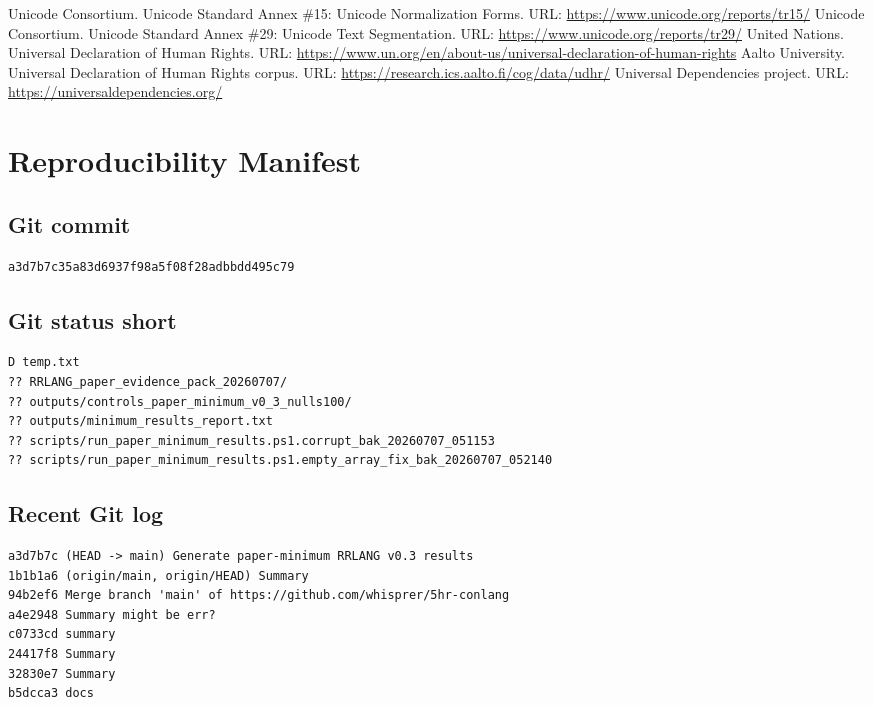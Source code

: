\documentclass[11pt,a4paper]{article}
\begin{document}
\begin{thebibliography}{99}
 Unicode Consortium. Unicode Standard Annex \#15: Unicode Normalization Forms. URL: \url{https://www.unicode.org/reports/tr15/}
 Unicode Consortium. Unicode Standard Annex \#29: Unicode Text Segmentation. URL: \url{https://www.unicode.org/reports/tr29/}
 United Nations. Universal Declaration of Human Rights. URL: \url{https://www.un.org/en/about-us/universal-declaration-of-human-rights}
 Aalto University. Universal Declaration of Human Rights corpus. URL: \url{https://research.ics.aalto.fi/cog/data/udhr/}
 Universal Dependencies project. URL: \url{https://universaldependencies.org/}
\end{thebibliography}


\appendix
\section{Reproducibility Manifest}
\subsection{Git commit}
\begin{lstlisting}
a3d7b7c35a83d6937f98a5f08f28adbbdd495c79
\end{lstlisting}
\subsection{Git status short}
\begin{lstlisting}
D temp.txt
?? RRLANG_paper_evidence_pack_20260707/
?? outputs/controls_paper_minimum_v0_3_nulls100/
?? outputs/minimum_results_report.txt
?? scripts/run_paper_minimum_results.ps1.corrupt_bak_20260707_051153
?? scripts/run_paper_minimum_results.ps1.empty_array_fix_bak_20260707_052140
\end{lstlisting}
\subsection{Recent Git log}
\begin{lstlisting}
a3d7b7c (HEAD -> main) Generate paper-minimum RRLANG v0.3 results
1b1b1a6 (origin/main, origin/HEAD) Summary
94b2ef6 Merge branch 'main' of https://github.com/whisprer/5hr-conlang
a4e2948 Summary might be err?
c0733cd summary
24417f8 Summary
32830e7 Summary
b5dcca3 docs
\end{lstlisting}
\end{document}
